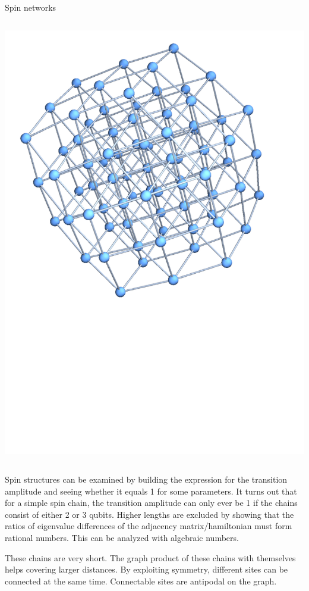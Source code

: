 {\begin{frame}[t]{Spin networks}
\begin{columns}[T]
\begin{column}{0.33\textwidth}
     		\includegraphics[trim=30mm 0 0 0, width=\textwidth]{Images/chain3_hypercube}
		\end{column}
	\end{columns}
\end{frame}}

\begin{center}
\end{center}

\noindent Spin structures can be examined by building the expression for the transition amplitude and seeing whether it equals 1 for some parameters. It turns out that for a simple spin chain, the transition amplitude can only ever be 1 if the chains consist of either 2 or 3 qubits\cite{Christandl2005}. Higher lengths are excluded by showing that the ratios of eigenvalue differences of the adjacency matrix/hamiltonian must form rational numbers. This can be analyzed with algebraic numbers.\par
These chains are very short. The graph product of these chains with themselves helps covering larger distances. By exploiting symmetry, different sites can be connected at the same time. Connectable sites are antipodal on the graph.

